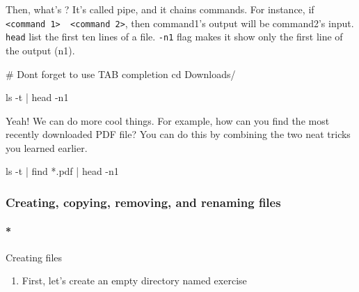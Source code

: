 \documentclass[
  letterpaper,
  DIV=11,
  numbers=noendperiod]{scrreprt}
\let\oldparagraph\paragraph
\renewcommand{\paragraph}[1]{\oldparagraph{#1}\mbox{}}
\newenvironment{Shaded}{\begin{snugshade}}{\end{snugshade}}
\newcommand{\AttributeTok}[1]{\textcolor[rgb]{0.40,0.45,0.13}{#1}}
\newcommand{\BuiltInTok}[1]{\textcolor[rgb]{0.00,0.23,0.31}{#1}}
\newcommand{\CommentTok}[1]{\textcolor[rgb]{0.37,0.37,0.37}{#1}}
\newcommand{\FunctionTok}[1]{\textcolor[rgb]{0.28,0.35,0.67}{#1}}
\newcommand{\KeywordTok}[1]{\textcolor[rgb]{0.00,0.23,0.31}{#1}}
\newcommand{\NormalTok}[1]{\textcolor[rgb]{0.00,0.23,0.31}{#1}}
\newcommand{\PreprocessorTok}[1]{\textcolor[rgb]{0.68,0.00,0.00}{#1}}
\providecommand{\tightlist}{%
  \setlength{\itemsep}{0pt}\setlength{\parskip}{0pt}}\usepackage{longtable,booktabs,array}
\begin{document}
Then, what's \texttt{\textbar{}}? It's called pipe, and it chains
commands. For instance, if
\texttt{\textless{}command\ 1\textgreater{}\ \textbar{}\ \textless{}command\ 2\textgreater{}},
then command1's output will be command2's input. \texttt{head} list the
first ten lines of a file. \texttt{-n1} flag makes it show only the
first line of the output (n1).

\begin{Shaded}
\begin{Highlighting}[]
\CommentTok{\# Don\textquotesingle{}t forget to use TAB completion}
\BuiltInTok{cd}\NormalTok{ Downloads/ }

\FunctionTok{ls} \AttributeTok{{-}t} \KeywordTok{|} \FunctionTok{head} \AttributeTok{{-}n1}
\end{Highlighting}
\end{Shaded}

Yeah! We can do more cool things. For example, how can you find the most
recently downloaded PDF file? You can do this by combining the two neat
tricks you learned earlier.

\begin{Shaded}
\begin{Highlighting}[]
\FunctionTok{ls} \AttributeTok{{-}t} \KeywordTok{|} \FunctionTok{find} \PreprocessorTok{*}\NormalTok{.pdf }\KeywordTok{|} \FunctionTok{head} \AttributeTok{{-}n1} 
\end{Highlighting}
\end{Shaded}

\hypertarget{creating-copying-removing-and-renaming-files}{%
\subsubsection*{Creating, copying, removing, and renaming
files}\label{creating-copying-removing-and-renaming-files}}

\hypertarget{creating-files}{%
\paragraph*{Creating files}\label{creating-files}}

\begin{enumerate}
\def\labelenumi{\arabic{enumi}.}
\tightlist
\item
  First, let's create an empty directory named exercise
\end{enumerate}
\end{document}
